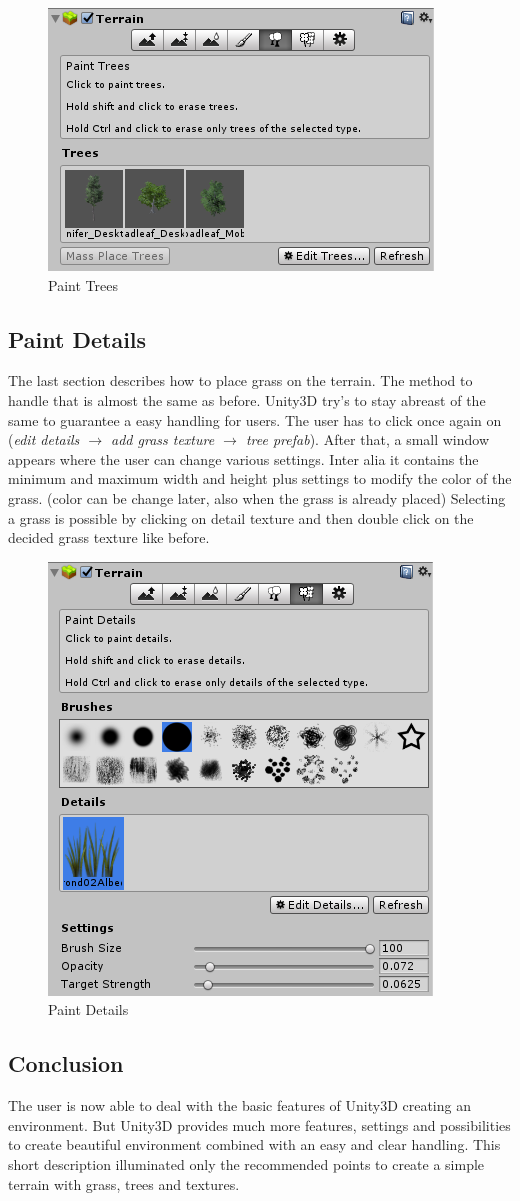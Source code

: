 \documentclass[12pt, a4paper, titlepage]{article}
\begin{document}
\begin{figure}[htbp]
  \centering
  \includegraphics[width=.4\textwidth]{pictures/paint_trees}
  \caption{Paint Trees}
  \label{fig:paint_trees}
\end{figure}

\subsection{Paint Details}
The last section describes how to place grass on the terrain. The method to handle that is almost the same as before. Unity3D try’s to 
stay abreast of the same to guarantee a easy handling for users. The user has to click once again on (\emph{edit details $\rightarrow$ add grass texture $\rightarrow$ tree prefab}). After that, a small window appears where the user can change various settings. Inter alia it contains the minimum and maximum width and height plus settings to modify the color of the grass. (color can be change later, also when the grass is already placed) Selecting a grass is possible by clicking on detail texture and then double click on the decided grass texture like before. 


\begin{figure}[htbp]
  \centering
  \includegraphics[width=.4\textwidth]{pictures/paint_details}
  \caption{Paint Details}
  \label{fig:paint_details}
\end{figure}

\subsection{Conclusion}
The user is now able to deal with the basic features of Unity3D creating an environment. But Unity3D provides much more features, settings and possibilities to create beautiful environment combined with an easy and clear handling. This short description illuminated only the recommended points to create a simple terrain with grass, trees and textures.
\end{document}
